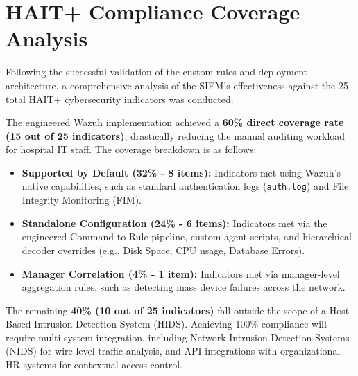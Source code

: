 \section{HAIT+ Compliance Coverage Analysis}
\label{sec:coverage-analysis}
Following the successful validation of the custom rules and deployment
architecture, a comprehensive analysis of the SIEM's effectiveness against
the 25 total HAIT+ cybersecurity indicators \cite{hait_plus} was conducted.

The engineered Wazuh implementation achieved a \textbf{60\% direct coverage rate (15 out of 25 indicators)}, drastically reducing the manual auditing workload for hospital IT staff. The coverage breakdown is as follows:
\begin{itemize}
\item \textbf{Supported by Default (32\% - 8 items):} Indicators met using Wazuh's native capabilities, such as standard authentication logs (\texttt{auth.log}) and File Integrity Monitoring (FIM).
\item \textbf{Standalone Configuration (24\% - 6 items):} Indicators met via the engineered Command-to-Rule pipeline, custom agent scripts, and hierarchical decoder overrides (e.g., Disk Space, CPU usage, Database Errors).
\item \textbf{Manager Correlation (4\% - 1 item):} Indicators met via manager-level aggregation rules, such as detecting mass device failures across the network.
\end{itemize}

The remaining \textbf{40\% (10 out of 25 indicators)} fall outside the scope of a Host-Based Intrusion Detection System (HIDS). Achieving 100\% compliance will require multi-system integration, including Network Intrusion Detection Systems (NIDS) for wire-level traffic analysis, and API integrations with organizational HR systems for contextual access control.